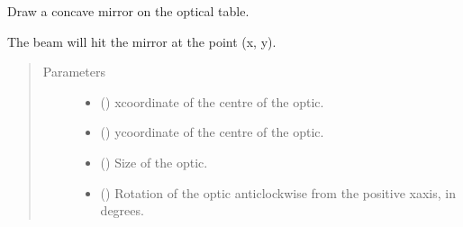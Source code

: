 \documentclass[letterpaper,10pt,english]{sphinxmanual}
\begin{document}
\begin{fulllineitems}
\begin{fulllineitems}
\end{fulllineitems}


\begin{fulllineitems}
\label{\detokenize{index:pyopticaltable.OpticalTable.concave_mirror}}
\sphinxAtStartPar
Draw a concave mirror on the optical table.

\sphinxAtStartPar
The beam will hit the mirror at the point (x, y).
\begin{quote}\begin{description}
\item[{Parameters}] \leavevmode\begin{itemize}
\item {} 
\sphinxAtStartPar
{} () \textendash{} x\sphinxhyphen{}coordinate of the centre of the optic.

\item {} 
\sphinxAtStartPar
{} () \textendash{} y\sphinxhyphen{}coordinate of the centre of the optic.

\item {} 
\sphinxAtStartPar
{} () \textendash{} Size of the optic.

\item {} 
\sphinxAtStartPar
{} () \textendash{} Rotation of the optic anticlockwise from the positive x\sphinxhyphen{}axis, in degrees.


\end{itemize}
\end{description}
\end{quote}
\end{fulllineitems}
\end{fulllineitems}
\end{document}
